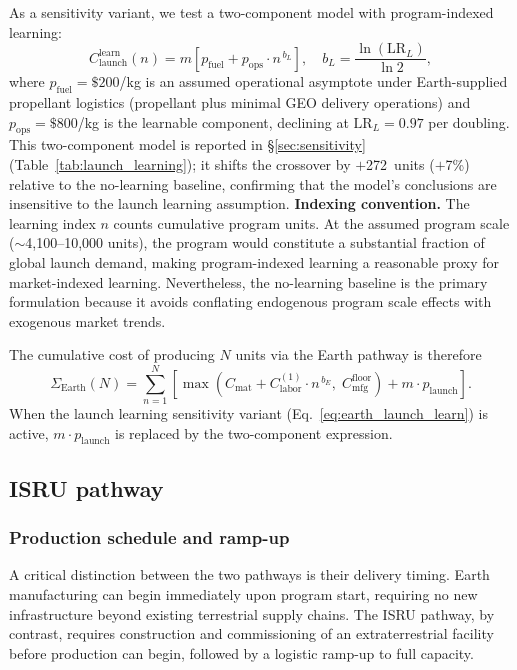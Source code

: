 \documentclass[preprint,12pt]{elsarticle}
\begin{document}
As a sensitivity variant, we test a two-component model with program-indexed learning:
\begin{equation}
  C_{\mathrm{launch}}^{\mathrm{learn}}(n) = m \left[ p_{\mathrm{fuel}} + p_{\mathrm{ops}} \cdot n^{\,b_L} \right], \quad b_L = \frac{\ln(\mathrm{LR}_L)}{\ln 2},
  \label{eq:earth_launch_learn}
\end{equation}
where $p_{\mathrm{fuel}} = \$200$/kg is an assumed operational asymptote under Earth-supplied propellant logistics (propellant plus minimal GEO delivery operations) and $p_{\mathrm{ops}} = \$800$/kg is the learnable component, declining at $\mathrm{LR}_L = 0.97$ per doubling. This two-component model is reported in \S\ref{sec:sensitivity} (Table~\ref{tab:launch_learning}); it shifts the crossover by $+$272~units ($+$7\%) relative to the no-learning baseline, confirming that the model's conclusions are insensitive to the launch learning assumption. \textbf{Indexing convention.} The learning index $n$ counts cumulative program units. At the assumed program scale ($\sim$4{,}100--10{,}000 units), the program would constitute a substantial fraction of global launch demand, making program-indexed learning a reasonable proxy for market-indexed learning. Nevertheless, the no-learning baseline is the primary formulation because it avoids conflating endogenous program scale effects with exogenous market trends.

The cumulative cost of producing $N$ units via the Earth pathway is therefore
\begin{equation}
  \Sigma_{\mathrm{Earth}}(N) = \sum_{n=1}^{N} \left[ \max\!\left(C_{\mathrm{mat}} + C_{\mathrm{labor}}^{(1)} \cdot n^{\,b_E},\; C_{\mathrm{mfg}}^{\mathrm{floor}}\right) + m \cdot p_{\mathrm{launch}} \right].
  \label{eq:earth_cum}
\end{equation}
When the launch learning sensitivity variant (Eq.~\ref{eq:earth_launch_learn}) is active, $m \cdot p_{\mathrm{launch}}$ is replaced by the two-component expression.

\subsection{ISRU pathway}

\subsubsection{Production schedule and ramp-up}

A critical distinction between the two pathways is their delivery timing. Earth manufacturing can begin immediately upon program start, requiring no new infrastructure beyond existing terrestrial supply chains. The ISRU pathway, by contrast, requires construction and commissioning of an extraterrestrial facility before production can begin, followed by a logistic ramp-up to full capacity.
\end{document}
